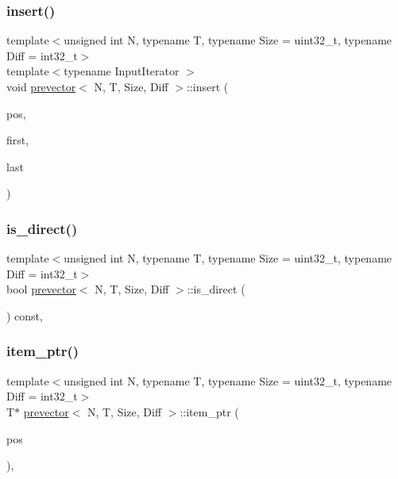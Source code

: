 \subsubsection{\texorpdfstring{insert()}{insert()}\hspace{0.1cm}{\footnotesize\ttfamily [3/3]}}
{\footnotesize\ttfamily template$<$unsigned int N, typename T, typename Size = uint32\+\_\+t, typename Diff = int32\+\_\+t$>$ \\
template$<$typename Input\+Iterator $>$ \\
void \mbox{\hyperlink{classprevector}{prevector}}$<$ N, T, Size, Diff $>$\+::insert (\begin{DoxyParamCaption}\item[{\mbox{\hyperlink{classprevector_1_1iterator}{iterator}}}]{pos,  }\item[{Input\+Iterator}]{first,  }\item[{Input\+Iterator}]{last }\end{DoxyParamCaption})\hspace{0.3cm}{\ttfamily [inline]}}

\mbox{\label{classprevector_a933e204a7e29c6bbc85479d023c00ff8}} 
\subsubsection{\texorpdfstring{is\+\_\+direct()}{is\_direct()}}
{\footnotesize\ttfamily template$<$unsigned int N, typename T, typename Size = uint32\+\_\+t, typename Diff = int32\+\_\+t$>$ \\
bool \mbox{\hyperlink{classprevector}{prevector}}$<$ N, T, Size, Diff $>$\+::is\+\_\+direct (\begin{DoxyParamCaption}{ }\end{DoxyParamCaption}) const\hspace{0.3cm}{\ttfamily [inline]}, {\ttfamily [private]}}

\mbox{\label{classprevector_a59f1d7bcbc751cfa0faddd7ffa184846}} 
\subsubsection{\texorpdfstring{item\+\_\+ptr()}{item\_ptr()}\hspace{0.1cm}{\footnotesize\ttfamily [1/2]}}
{\footnotesize\ttfamily template$<$unsigned int N, typename T, typename Size = uint32\+\_\+t, typename Diff = int32\+\_\+t$>$ \\
T$\ast$ \mbox{\hyperlink{classprevector}{prevector}}$<$ N, T, Size, Diff $>$\+::item\+\_\+ptr (\begin{DoxyParamCaption}\item[{\mbox{\hyperlink{classprevector_a34ad7f610eefb33a8db9161cadf15dbe}{difference\+\_\+type}}}]{pos }\end{DoxyParamCaption})\hspace{0.3cm}{\ttfamily [inline]}, {\ttfamily [private]}}

